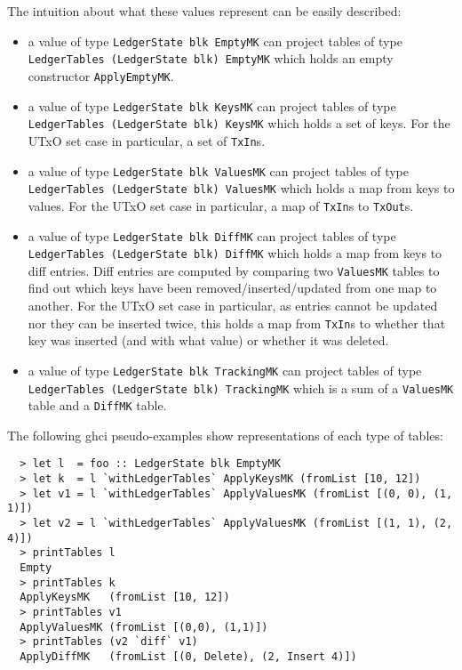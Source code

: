 \documentclass[11pt,a4paper]{article}
\theoremstyle{definition}
\begin{document}
The intuition about what these values represent can be easily described:
\begin{itemize}
  \item a value of type \texttt{LedgerState blk EmptyMK} can project tables of
        type \texttt{LedgerTables (LedgerState blk) EmptyMK} which holds an
        empty constructor \texttt{ApplyEmptyMK}.
  \item a value of type \texttt{LedgerState blk KeysMK} can project tables of
        type \texttt{LedgerTables (LedgerState blk) KeysMK} which holds a set of
        keys. For the UTxO set case in particular, a set of \texttt{TxIn}s.
  \item a value of type \texttt{LedgerState blk ValuesMK} can project tables of
        type \texttt{LedgerTables (LedgerState blk) ValuesMK} which holds a map
        from keys to values. For the UTxO set case in particular, a map of
        \texttt{TxIn}s to \texttt{TxOut}s.
  \item a value of type \texttt{LedgerState blk DiffMK} can project tables of
        type \texttt{LedgerTables (LedgerState blk) DiffMK} which holds a map
        from keys to diff entries. Diff entries are computed by comparing two
        \texttt{ValuesMK} tables to find out which keys have been
        removed/inserted/updated from one map to another. For the UTxO set case
        in particular, as entries cannot be updated nor they can be inserted
        twice, this holds a map from \texttt{TxIn}s to whether that key was
        inserted (and with what value) or whether it was deleted.
  \item a value of type \texttt{LedgerState blk TrackingMK} can project tables
        of type \texttt{LedgerTables (LedgerState blk) TrackingMK} which is a
        sum of a \texttt{ValuesMK} table and a \texttt{DiffMK} table.
\end{itemize}

The following ghci pseudo-examples show representations of each type of tables:

\begin{lstlisting}
  > let l  = foo :: LedgerState blk EmptyMK
  > let k  = l `withLedgerTables` ApplyKeysMK (fromList [10, 12])
  > let v1 = l `withLedgerTables` ApplyValuesMK (fromList [(0, 0), (1, 1)])
  > let v2 = l `withLedgerTables` ApplyValuesMK (fromList [(1, 1), (2, 4)])
  > printTables l
  Empty
  > printTables k
  ApplyKeysMK   (fromList [10, 12])
  > printTables v1
  ApplyValuesMK (fromList [(0,0), (1,1)])
  > printTables (v2 `diff` v1)
  ApplyDiffMK   (fromList [(0, Delete), (2, Insert 4)])
\end{lstlisting}
\end{document}
